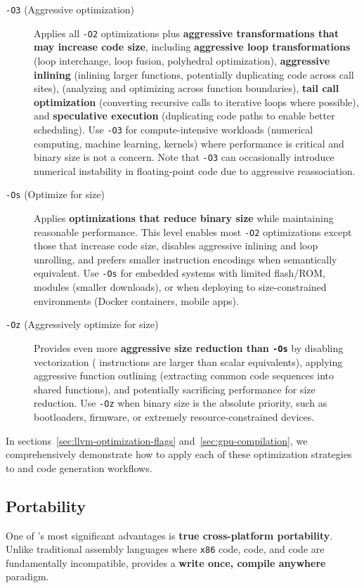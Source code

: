 \begin{description}
  \item[\texttt{-O3} (Aggressive optimization)] Applies all \texttt{-O2} optimizations plus \textbf{aggressive transformations that may increase code size}, including \textbf{aggressive loop transformations} (loop interchange, loop fusion, polyhedral optimization), \textbf{aggressive inlining} (inlining larger functions, potentially duplicating code across call sites), \textbf{} (analyzing and optimizing across function boundaries), \textbf{tail call optimization} (converting recursive calls to iterative loops where possible), and \textbf{speculative execution} (duplicating code paths to enable better scheduling). Use \texttt{-O3} for compute-intensive workloads (numerical computing, machine learning,  kernels) where performance is critical and binary size is not a concern. Note that \texttt{-O3} can occasionally introduce numerical instability in floating-point code due to aggressive reassociation.

  \item[\texttt{-Os} (Optimize for size)] Applies \textbf{optimizations that reduce binary size} while maintaining reasonable performance. This level enables most \texttt{-O2} optimizations except those that increase code size, disables aggressive inlining and loop unrolling, and prefers smaller instruction encodings when semantically equivalent. Use \texttt{-Os} for embedded systems with limited flash/ROM,  modules (smaller downloads), or when deploying to size-constrained environments (Docker containers, mobile apps).

  \item[\texttt{-Oz} (Aggressively optimize for size)] Provides even more \textbf{aggressive size reduction than \texttt{-Os}} by disabling vectorization ( instructions are larger than scalar equivalents), applying aggressive function outlining (extracting common code sequences into shared functions), and potentially sacrificing performance for size reduction. Use \texttt{-Oz} when binary size is the absolute priority, such as bootloaders, firmware, or extremely resource-constrained  devices.
\end{description}

In sections~\ref{sec:llvm-optimization-flags} and~\ref{sec:gpu-compilation}, we comprehensively demonstrate how to apply each of these optimization strategies to  and  code generation workflows.

\subsection{Portability}
One of  's most significant advantages is \textbf{true cross-platform portability}. Unlike traditional assembly languages where \texttt{x86} code,  code, and  code are fundamentally incompatible,   provides a \textbf{write once, compile anywhere} paradigm.

